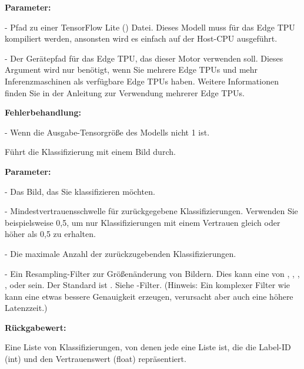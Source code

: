\medskip


\textbf{Parameter:}

 - Pfad zu einer TensorFlow Lite () Datei. Dieses Modell muss für das Edge TPU kompiliert werden, ansonsten wird es einfach auf der Host-CPU ausgeführt.

 - Der Gerätepfad für das Edge TPU, das dieser Motor verwenden soll. Dieses Argument wird nur benötigt, wenn Sie mehrere Edge TPUs und mehr Inferenzmaschinen als verfügbare Edge TPUs haben. Weitere Informationen finden Sie in der Anleitung zur Verwendung mehrerer Edge TPUs.


\medskip


\textbf{Fehlerbehandlung:}

 - Wenn die Ausgabe-Tensorgröße des Modells nicht 1 ist.


\bigskip


Führt die Klassifizierung mit einem Bild durch.

\textbf{Parameter:}

 - Das Bild, das Sie klassifizieren möchten.

 - Mindestvertrauensschwelle für zurückgegebene Klassifizierungen. 
Verwenden Sie beispielsweise 0,5, um nur Klassifizierungen mit einem Vertrauen gleich oder höher als 0,5 zu erhalten.

  - Die maximale Anzahl der zurückzugebenden Klassifizierungen. 

 - Ein Resampling-Filter zur Größenänderung von Bildern. Dies kann eine von , , , ,  oder  sein. Der Standard ist . Siehe -Filter. (Hinweis: Ein komplexer Filter wie  kann eine etwas bessere Genauigkeit erzeugen, verursacht aber auch eine höhere Latenzzeit.)

\medskip


\textbf{Rückgabewert:}

Eine Liste von Klassifizierungen, von denen jede eine Liste  ist, die die Label-ID (int) und den Vertrauenswert (float) repräsentiert.

\medskip


